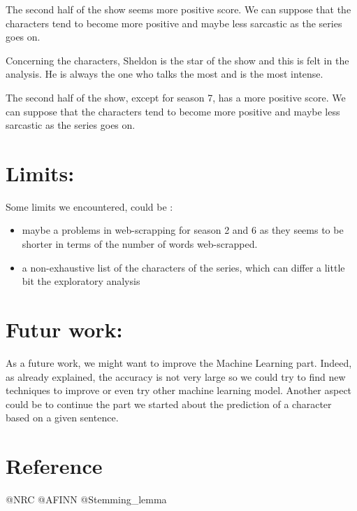 \documentclass[
]{article}
\providecommand{\tightlist}{%
  \setlength{\itemsep}{0pt}\setlength{\parskip}{0pt}}
\newlength{\cslhangindent}
\newlength{\cslentryspacingunit} %
\newenvironment{CSLReferences}[2] %
 {%
  \setlength{\parindent}{0pt}
  \ifodd #1
  \let\oldpar\par
  \def\par{\hangindent=\cslhangindent\oldpar}
  \fi
  \setlength{\parskip}{#2\cslentryspacingunit}
 }%
 {}
\begin{document}
The second half of the show seems more positive score. We can suppose
that the characters tend to become more positive and maybe less
sarcastic as the series goes on.

Concerning the characters, Sheldon is the star of the show and this is
felt in the analysis. He is always the one who talks the most and is the
most intense.

The second half of the show, except for season 7, has a more positive
score. We can suppose that the characters tend to become more positive
and maybe less sarcastic as the series goes on.

\hypertarget{limits}{%
\section{Limits:}\label{limits}}

Some limits we encountered, could be :

\begin{itemize}
\tightlist
\item
  maybe a problems in web-scrapping for season 2 and 6 as they seems to
  be shorter in terms of the number of words web-scrapped.
\item
  a non-exhaustive list of the characters of the series, which can
  differ a little bit the exploratory analysis
\end{itemize}

\hypertarget{futur-work}{%
\section{Futur work:}\label{futur-work}}

As a future work, we might want to improve the Machine Learning part.
Indeed, as already explained, the accuracy is not very large so we could
try to find new techniques to improve or even try other machine learning
model. Another aspect could be to continue the part we started about the
prediction of a character based on a given sentence.

\hypertarget{reference}{%
\section{Reference}\label{reference}}

@NRC @AFINN @Stemming\_lemma

\hypertarget{refs}{}
\begin{CSLReferences}{0}{0}
\end{CSLReferences}
\end{document}

